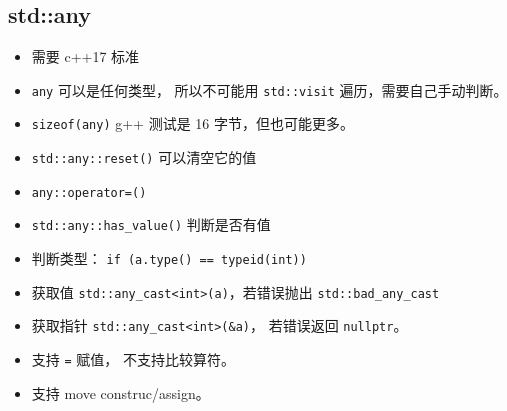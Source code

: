 \subsection{std::any}
\begin{itemize}
\item 需要 c++17 标准
\end{itemize}
\begin{itemize}
\item \verb|any| 可以是任何类型， 所以不可能用 \verb|std::visit| 遍历，需要自己手动判断。
\item \verb|sizeof(any)| g++ 测试是 16 字节，但也可能更多。
\item \verb|std::any::reset()| 可以清空它的值
\item \verb|any::operator=()| 
\item \verb|std::any::has_value()| 判断是否有值
\item 判断类型： \verb|if (a.type() == typeid(int))|
\item 获取值 \verb|std::any_cast<int>(a)|，若错误抛出 \verb|std::bad_any_cast|
\item 获取指针 \verb|std::any_cast<int>(&a)|， 若错误返回 \verb|nullptr|。
\item 支持 \verb|=| 赋值， 不支持比较算符。
\item 支持 move construc/assign。
\end{itemize}
